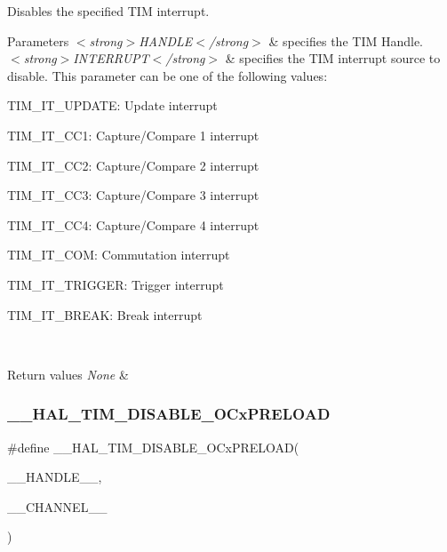 Disables the specified T\+IM interrupt. 


\begin{DoxyParams}{Parameters}
{\em $<$strong$>$\+H\+A\+N\+D\+L\+E$<$/strong$>$} & specifies the T\+IM Handle. \\
\hline
{\em $<$strong$>$\+I\+N\+T\+E\+R\+R\+U\+P\+T$<$/strong$>$} & specifies the T\+IM interrupt source to disable. This parameter can be one of the following values\+: \begin{DoxyItemize}
\item T\+I\+M\+\_\+\+I\+T\+\_\+\+U\+P\+D\+A\+TE\+: Update interrupt \item T\+I\+M\+\_\+\+I\+T\+\_\+\+C\+C1\+: Capture/\+Compare 1 interrupt \item T\+I\+M\+\_\+\+I\+T\+\_\+\+C\+C2\+: Capture/\+Compare 2 interrupt \item T\+I\+M\+\_\+\+I\+T\+\_\+\+C\+C3\+: Capture/\+Compare 3 interrupt \item T\+I\+M\+\_\+\+I\+T\+\_\+\+C\+C4\+: Capture/\+Compare 4 interrupt \item T\+I\+M\+\_\+\+I\+T\+\_\+\+C\+OM\+: Commutation interrupt \item T\+I\+M\+\_\+\+I\+T\+\_\+\+T\+R\+I\+G\+G\+ER\+: Trigger interrupt \item T\+I\+M\+\_\+\+I\+T\+\_\+\+B\+R\+E\+AK\+: Break interrupt \end{DoxyItemize}
\\
\hline
\end{DoxyParams}

\begin{DoxyRetVals}{Return values}
{\em None} & \\
\hline
\end{DoxyRetVals}
\mbox{\label{group___t_i_m___exported___macros_ga3e0ec4eb797b54c408a3be067f41a2f8}} 
\subsubsection{\texorpdfstring{\+\_\+\+\_\+\+H\+A\+L\+\_\+\+T\+I\+M\+\_\+\+D\+I\+S\+A\+B\+L\+E\+\_\+\+O\+Cx\+P\+R\+E\+L\+O\+AD}{\_\_HAL\_TIM\_DISABLE\_OCxPRELOAD}}
{\footnotesize\ttfamily \#define \+\_\+\+\_\+\+H\+A\+L\+\_\+\+T\+I\+M\+\_\+\+D\+I\+S\+A\+B\+L\+E\+\_\+\+O\+Cx\+P\+R\+E\+L\+O\+AD(\begin{DoxyParamCaption}\item[{}]{\+\_\+\+\_\+\+H\+A\+N\+D\+L\+E\+\_\+\+\_\+,  }\item[{}]{\+\_\+\+\_\+\+C\+H\+A\+N\+N\+E\+L\+\_\+\+\_\+ }\end{DoxyParamCaption})}

